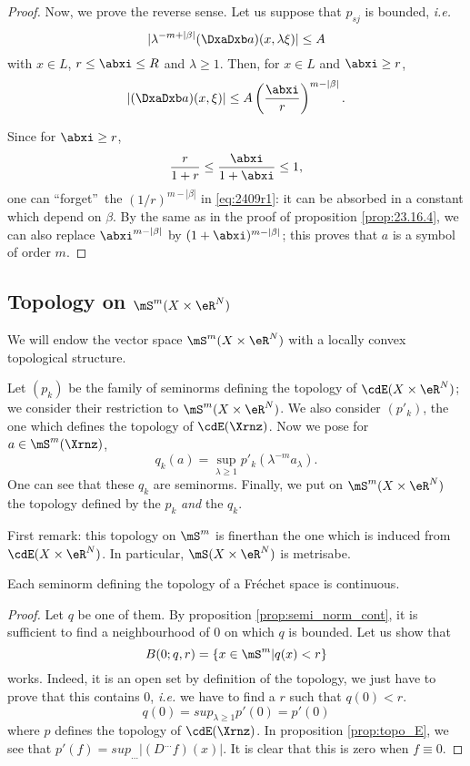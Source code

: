 \begin{proof}
Now, we prove the reverse sense. Let us suppose that $p_{sj}$ is bounded, \emph{i.e.}
\[
| \lambda^{-m+|\beta|}(\DxaDxb a)(x,\lambda\xi)|\leq A
\]
with $x\in L$, $r\leq\abxi\leq R$ and $\lambda\geq 1$. Then, for $x\in L$ and $\abxi\geq r$,
\begin{equation}\label{eq:2409r1}
   |(\DxaDxb a)(x,\xi)|\leq A\left(\frac{\abxi}{r}\right)^{m-|\beta|}.
\end{equation}

Since for $\abxi\geq r$,
\[
   \frac{r}{1+r}\leq\frac{\abxi}{1+\abxi}\leq 1,
\]
one can ``forget''\ the $(1/r)^{m-|\beta|}$ in \eqref{eq:2409r1}: it can be absorbed in a constant which depend on $\beta$. By the same as in the proof of proposition \ref{prop:23.16.4}, we can also replace $\abxi^{m-|\beta|}$ by $(1+\abxi)^{m-|\beta|}$; this proves that $a$ is a symbol of order $m$.

\end{proof}

\subsection{Topology on \texorpdfstring{$\mS^m(X\times\eR^N)$}{SmXRN}}

We will endow the vector space $\mS^m(X\times\eR^N)$ with a locally convex topological structure.

Let $(p_k)$ be the family of seminorms defining the topology of $\cdE(X\times\eR^N)$; we consider their restriction to $\mS^m(X\times\eR^N)$. We also consider $(p'_k)$, the one which defines the topology of $\cdE(\Xrnz)$. Now we pose for $a\in\mS^m(\Xrnz)$,
\[
   q_k(a)=\sup_{\lambda\geq 1}p'_k(\lambda^{-m}a_{\lambda}).
\]
One can see that these $q_k$ are seminorms. Finally, we put on $\mS^m(X\times\eR^N)$ the topology defined by the $p_k$ \emph{and} the $q_k$.

First remark: this topology on $\mS^m$ is finer\angl than the one which is induced from $\cdE(X\times\eR^N)$. In particular, $\mS(X\times\eR^N)$ is metrisabe\angl.

\begin{lemma}
Each seminorm defining the topology of a Fréchet space is continuous.
\label{lem:q_cont}
\end{lemma}
\begin{proof}
Let $q$ be one of them. By proposition \ref{prop:semi_norm_cont}, it is sufficient to find a neighbourhood of $0$ on which $q$ is bounded. Let us show that 
\[
   B(0;q,r)=\{x\in\mS^m|q(x)<r\}
\]
works. Indeed, it is an open set by definition of the topology, we just have to prove that this contains $0$, \emph{i.e.} we have to find a $r$ such that $q(0)<r$.
\[
  q(0)=sup_{\lambda\geq 1}p'(0)=p'(0)
\]
where $p$ defines the topology of $\cdE(\Xrnz)$. In proposition \ref{prop:topo_E}, we see that $p'(f)=sup_{\ldots}|(D^{\ldots}f)(x)|$. It is clear that this is zero when $f\equiv 0$.


\end{proof}

